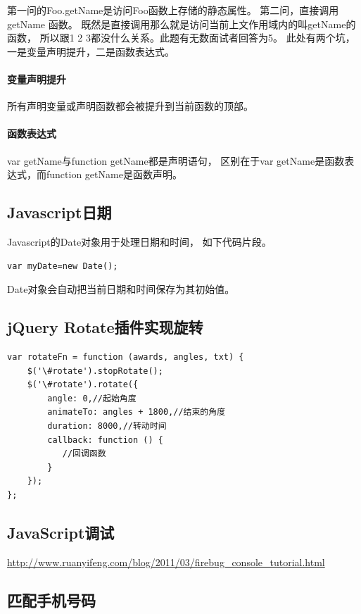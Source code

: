\documentclass{book}
\begin{document}
第一问的Foo.getName是访问Foo函数上存储的静态属性。
第二问，直接调用 getName 函数。
既然是直接调用那么就是访问当前上文作用域内的叫getName的函数，
所以跟1 2 3都没什么关系。此题有无数面试者回答为5。
此处有两个坑，一是变量声明提升，二是函数表达式。

\paragraph{变量声明提升}所有声明变量或声明函数都会被提升到当前函数的顶部。

\paragraph{函数表达式}var getName与function getName都是声明语句，
区别在于var getName是函数表达式，而function getName是函数声明。

\subsection{Javascript日期}

Javascript的Date对象用于处理日期和时间，
如下代码片段。

\begin{lstlisting}[language=VBScript]
var myDate=new Date();
\end{lstlisting}

Date对象会自动把当前日期和时间保存为其初始值。

\subsection{jQuery Rotate插件实现旋转}

\begin{lstlisting}[language=VBScript]
var rotateFn = function (awards, angles, txt) {
    $('\#rotate').stopRotate();
    $('\#rotate').rotate({
        angle: 0,//起始角度
        animateTo: angles + 1800,//结束的角度
        duration: 8000,//转动时间
        callback: function () {
           //回调函数
        }
    });
};
\end{lstlisting}

\subsection{JavaScript调试}

\url{http://www.ruanyifeng.com/blog/2011/03/firebug_console_tutorial.html}

\subsection{匹配手机号码}
\end{document}
